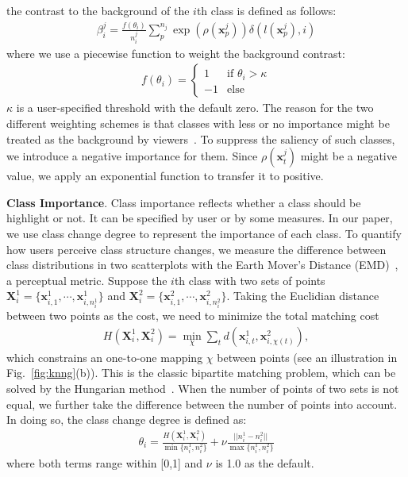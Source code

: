 the contrast to the background of the $i$th class is defined as follows:
\begin{align}\label{eq:ctbc}
 \beta^j_i = \frac{f(\theta_i)}{n^j_i}\sum^{n_j}_{p} \exp(\rho(\mathbf{x}^j_p)) \delta(l(\mathbf{x}^j_p),i)
\end{align}
where we use a piecewise function to weight the background contrast:
\begin{align}
f(\theta_i) =  \left\{ \begin{array}{ll}
1 & \textrm{if $\theta_i>\kappa$}\\
-1 & \textrm{else}
\end{array} \right.
\label{eq:piecewiseFunc}
\end{align}
$\kappa$ is a user-specified threshold with the default zero. The reason for the two different weighting schemes is that classes with less or no importance might be treated as the background by viewers~\cite{zhang2018review}. To suppress the saliency of such classes, we introduce a negative importance for them. Since $\rho (\mathbf{x}^j_t)$ might be a negative value, we apply an exponential function to transfer it to positive.

\vspace{1.5mm}
\noindent\textbf{Class Importance}.
Class importance reflects whether a class should be highlight or not. It can be specified by user or by some measures. In our paper, we use class change degree to represent the importance of each class. 
To quantify how users perceive class structure changes, we measure the difference between class distributions in two scatterplots with the Earth Mover's Distance (EMD)~\cite{rubner2000earth}, a perceptual metric.
Suppose the $i$th  class with two sets of points $\mathbf{X}^1_i = \{\mathbf{x}_{i,1}^1, \cdots , \mathbf{x}_{i,n^1_i}^1\}$ and $\mathbf{X}^2_i = \{\mathbf{x}_{i,1}^2, \cdots , \mathbf{x}_{i,n^2_i}^2\}$.
Taking the Euclidian distance between two points as the cost, we need to  minimize the total matching cost
\begin{align}\label{eq:emd}
 H(\mathbf{X}^1_i, \mathbf{X}^2_i)  = \min_\chi \sum_t d(\mathbf{x}_{i,t}^1, \mathbf{x}_{i,\chi(t)}^2),
\end{align}
which constrains an one-to-one mapping $\chi$ between points (see an illustration in Fig.~\ref{fig:knng}(b)). This is the classic bipartite matching problem, which can be solved by the Hungarian method~\cite{kuhn1955hungarian}.
When the number of points of two sets is not equal, we further take the difference between the number of points into account. In doing so, the class change degree is defined as:
\begin{align}\label{eq:cm}
 \theta_i= \frac{H(\mathbf{X}^1_i, \mathbf{X}^2_i) }{\min\{n^1_i, n^2_i\}} + \nu \frac{||n^1_i- n^2_i||}{\max\{n^1_i, n^2_i\}}
\end{align}
where both terms range within [0,1] and $\nu$ is 1.0 as the default.


